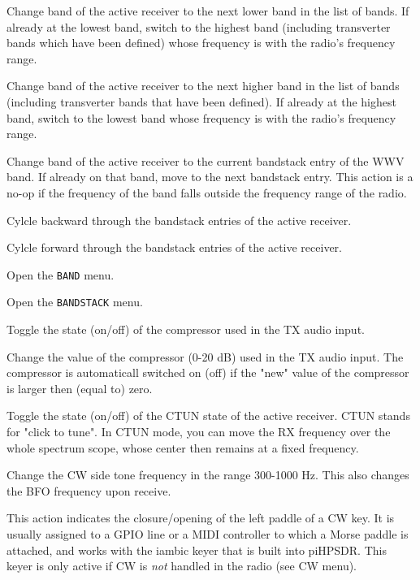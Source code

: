 \documentclass[12pt]{book}
\begin{document}
{Change band of the active receiver to the next lower band in the list of bands. If already at the lowest band, switch to
the highest band (including transverter bands which have been defined) whose frequency is with the radio's frequency range.}

{Change band of the active receiver to the next higher band in the list of bands (including transverter bands that have been
defined). If already at the highest band, switch to
the lowest band whose frequency is with the radio's frequency range.}

{Change band of the active receiver to the current bandstack entry of the WWV band. If already on that band, move to
the next bandstack entry. This action is a no-op if the frequency of the band falls outside the frequency range
of the radio.}

{Cylcle backward through the bandstack entries of the active receiver.}

{Cylcle forward through the bandstack entries of the active receiver.}

{Open the \texttt{BAND} menu.}

{Open the \texttt{BANDSTACK} menu.}

{Toggle the state (on/off) of the compressor used in the TX audio input.}

{Change the value of the compressor (0-20 dB) used in the TX audio input. The compressor is automaticall switched on (off) if
the "new" value of the compressor is larger then  (equal to) zero.}

{Toggle the state (on/off) of the CTUN state of the active receiver. CTUN stands for "click to tune". In CTUN mode, you can move
the RX frequency over the whole spectrum scope, whose center then remains at a fixed frequency.}

{Change the CW side tone frequency in the range 300-1000 Hz. This also changes the BFO frequency upon receive.}

{This action indicates the closure/opening of the left paddle of a CW key. It is usually assigned to a GPIO line or a MIDI
controller to which a Morse paddle is attached, and works with the iambic keyer that is built into piHPSDR. This keyer
is only active if CW is \textit{not} handled in the radio (see CW menu).}
\end{document}
